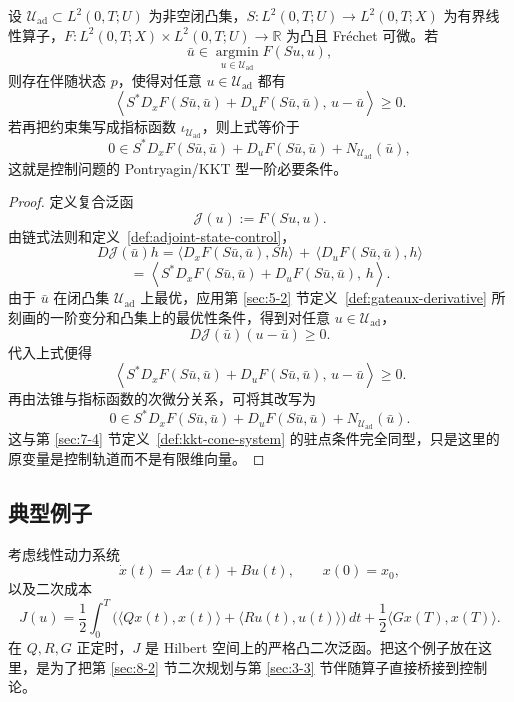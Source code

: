\begin{theorem}\label{thm:pontryagin-convex-necessary}
设 $\mathcal U_{\mathrm{ad}}\subset L^2(0,T;U)$ 为非空闭凸集，$S\colon L^2(0,T;U)\to L^2(0,T;X)$ 为有界线性算子，$F\colon L^2(0,T;X)\times L^2(0,T;U)\to \mathbb R$ 为凸且 Fr\'echet 可微。若
\[
\bar u\in \operatorname*{argmin}_{u\in \mathcal U_{\mathrm{ad}}}F(Su,u),
\]
则存在伴随状态 $p$，使得对任意 $u\in \mathcal U_{\mathrm{ad}}$ 都有
\[
\left\langle S^\ast D_xF(S\bar u,\bar u)+D_uF(S\bar u,\bar u),\,u-\bar u\right\rangle \ge 0.
\]
若再把约束集写成指标函数 $\iota_{\mathcal U_{\mathrm{ad}}}$，则上式等价于
\[
0\in S^\ast D_xF(S\bar u,\bar u)+D_uF(S\bar u,\bar u)+N_{\mathcal U_{\mathrm{ad}}}(\bar u),
\]
这就是控制问题的 Pontryagin/KKT 型一阶必要条件。
\end{theorem}

\begin{proof}
定义复合泛函
\[
\mathcal J(u):=F(Su,u).
\]
由链式法则和定义~\ref{def:adjoint-state-control}，
\[
D\mathcal J(\bar u)h
=
\langle D_xF(S\bar u,\bar u),Sh\rangle
\,+\,\langle D_uF(S\bar u,\bar u),h\rangle
\]
\[
=
\left\langle S^\ast D_xF(S\bar u,\bar u)+D_uF(S\bar u,\bar u),\,h\right\rangle.
\]
由于 $\bar u$ 在闭凸集 $\mathcal U_{\mathrm{ad}}$ 上最优，应用第 \ref{sec:5-2} 节定义~\ref{def:gateaux-derivative} 所刻画的一阶变分和凸集上的最优性条件，得到对任意 $u\in \mathcal U_{\mathrm{ad}}$，
\[
D\mathcal J(\bar u)(u-\bar u)\ge 0.
\]
代入上式便得
\[
\left\langle S^\ast D_xF(S\bar u,\bar u)+D_uF(S\bar u,\bar u),\,u-\bar u\right\rangle \ge 0.
\]
再由法锥与指标函数的次微分关系，可将其改写为
\[
0\in S^\ast D_xF(S\bar u,\bar u)+D_uF(S\bar u,\bar u)+N_{\mathcal U_{\mathrm{ad}}}(\bar u).
\]
这与第 \ref{sec:7-4} 节定义~\ref{def:kkt-cone-system} 的驻点条件完全同型，只是这里的原变量是控制轨道而不是有限维向量。
\end{proof}

\subsection{典型例子}

\begin{example}
考虑线性动力系统
\[
\dot x(t)=Ax(t)+Bu(t),\qquad x(0)=x_0,
\]
以及二次成本
\[
J(u)=\frac12\int_0^T \bigl(\langle Qx(t),x(t)\rangle+\langle Ru(t),u(t)\rangle\bigr)\,dt+\frac12\langle Gx(T),x(T)\rangle.
\]
在 $Q,R,G$ 正定时，$J$ 是 Hilbert 空间上的严格凸二次泛函。把这个例子放在这里，是为了把第 \ref{sec:8-2} 节二次规划与第 \ref{sec:3-3} 节伴随算子直接桥接到控制论。
\end{example}

